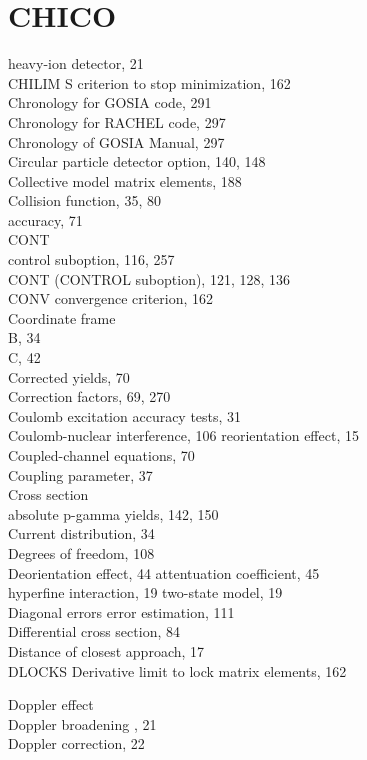 \documentclass[10pt]{article}
\begin{document}
\section*{CHICO}
heavy-ion detector, 21\\
CHILIM S criterion to stop minimization, 162\\
Chronology for GOSIA code, 291\\
Chronology for RACHEL code, 297\\
Chronology of GOSIA Manual, 297\\
Circular particle detector option, 140, 148\\
Collective model matrix elements, 188\\
Collision function, 35, 80\\
accuracy, 71\\
CONT\\
control suboption, 116, 257\\
CONT (CONTROL suboption), 121, 128, 136\\
CONV convergence criterion, 162\\
Coordinate frame\\
B, 34\\
C, 42\\
Corrected yields, 70\\
Correction factors, 69, 270\\
Coulomb excitation accuracy tests, 31\\
Coulomb-nuclear interference, 106 reorientation effect, 15\\
Coupled-channel equations, 70\\
Coupling parameter, 37\\
Cross section\\
absolute p-gamma yields, 142, 150\\
Current distribution, 34\\
Degrees of freedom, 108\\
Deorientation effect, 44 attentuation coefficient, 45\\
hyperfine interaction, 19 two-state model, 19\\
Diagonal errors error estimation, 111\\
Differential cross section, 84\\
Distance of closest approach, 17\\
DLOCKS Derivative limit to lock matrix elements, 162

Doppler effect\\
Doppler broadening , 21\\
Doppler correction, 22
\end{document}
